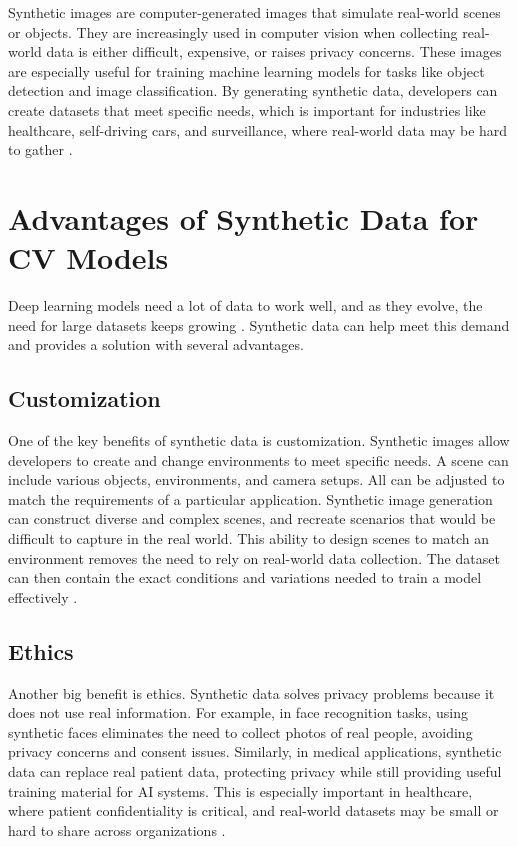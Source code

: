 Synthetic images are computer-generated images that simulate real-world scenes or objects. They are increasingly used in computer vision when collecting real-world data is either difficult, expensive, or raises privacy concerns. These images are especially useful for training machine learning models for tasks like object detection and image classification. By generating synthetic data, developers can create datasets that meet specific needs, which is important for industries like healthcare, self-driving cars, and surveillance, where real-world data may be hard to gather \cite{jimaging8110310}.

\section{Advantages of Synthetic Data for CV Models}

Deep learning models need a lot of data to work well, and as they evolve, the need for large datasets keeps growing \cite{10.1145/3042064, nikolenko2021synthetic}. Synthetic data can help meet this demand and provides a solution with several advantages.
 
\subsection{Customization}
One of the key benefits of synthetic data is customization. Synthetic images allow developers to create and change environments to meet specific needs. A scene can include various objects, environments, and camera setups. All can be adjusted to match the requirements of a particular application. Synthetic image generation can construct diverse and complex scenes, and recreate scenarios that would be difficult to capture in the real world. This ability to design scenes to match an environment removes the need to rely on real-world data collection. The dataset can then contain the exact conditions and variations needed to train a model effectively \cite{jimaging8110310, rajpura2017objectdetectionusingdeep}.

\subsection{Ethics}
Another big benefit is ethics. Synthetic data solves privacy problems because it does not use real information. For example, in face recognition tasks, using synthetic faces eliminates the need to collect photos of real people, avoiding privacy concerns and consent issues. Similarly, in medical applications, synthetic data can replace real patient data, protecting privacy while still providing useful training material for AI systems. This is especially important in healthcare, where patient confidentiality is critical, and real-world datasets may be small or hard to share across organizations \cite{jimaging8110310}.

